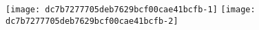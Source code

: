 \texttt{[image: dc7b7277705deb7629bcf00cae41bcfb-1]}%
\ifx\betweenLilyPondSystem \undefined
  \linebreak
\else
  \expandafter{}%
\fi
\texttt{[image: dc7b7277705deb7629bcf00cae41bcfb-2]}%
